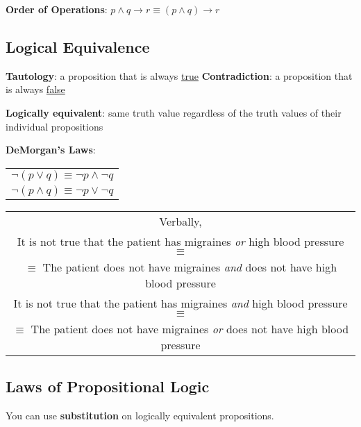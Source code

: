\begin{center}
  \textbf{Order of Operations}: \(p \land q \rightarrow r \equiv (p \land q) \rightarrow r\)
\end{center}

\subsection{Logical Equivalence}

\begin{center}
  \textbf{Tautology}: a proposition that is always \underline{true}
  \qquad
  \textbf{Contradiction}: a proposition that is always \underline{false}
\end{center}

\textbf{Logically equivalent}: same truth value regardless of the truth values of their individual propositions

\textbf{DeMorgan's Laws}:
\qquad
\begin{tabular}{c}
  \(\lnot (p \lor q) \equiv \lnot p \land \lnot q\) \\
  \(\lnot (p \land q) \equiv \lnot p \lor \lnot q\)
\end{tabular}

\begin{center}
  \begin{tabular}{c}
    Verbally,                                                                                     \\
    It is not true that the patient has migraines \textit{or} high blood pressure \(\equiv\)      \\
    \(\equiv\) The patient does not have migraines \textit{and} does not have high blood pressure \\
    \hline
    It is not true that the patient has migraines \textit{and} high blood pressure \(\equiv\)     \\
    \(\equiv\) The patient does not have migraines \textit{or} does not have high blood pressure  \\
  \end{tabular}
\end{center}

\subsection{Laws of Propositional Logic}

\begin{center}
  You can use \textbf{substitution} on logically equivalent propositions.
\end{center}

